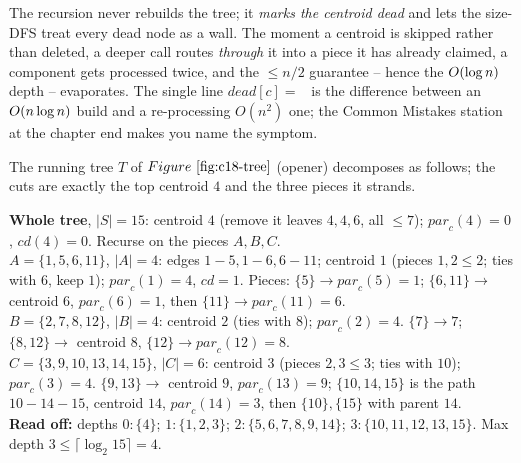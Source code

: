 \begin{insightbox}
The recursion never rebuilds the tree; it \emph{marks the centroid dead} and lets
the size-DFS treat every dead node as a wall. The moment a centroid is skipped
rather than deleted, a deeper call routes \emph{through} it into a piece it has
already claimed, a component gets processed twice, and the \(\le n/2\) guarantee
-- hence the \(O(\log n)\) depth -- evaporates. The single line
\(\mathit{dead}[c]=\)~ is the difference between an
\(O(n\log n)\) build and a re-processing \(O(n^2)\) one; the Common Mistakes
station at the chapter end makes you name the symptom.
\end{insightbox}

The running tree \(T\) of \(\figref{c18-tree}\) (opener) decomposes as follows;
the cuts are exactly the top centroid \(4\) and the three pieces it strands.

\begin{tracebox}
\textbf{Whole tree}, \(|S|=15\): centroid \(4\) (remove it leaves \(4,4,6\), all
\(\le 7\)); \(\mathit{par}_c(4)=0\), \(\mathit{cd}(4)=0\). Recurse on the pieces
\(A,B,C\).\\
\textbf{\(A=\{1,5,6,11\}\)}, \(|A|=4\): edges \(1\!-\!5,1\!-\!6,6\!-\!11\); centroid
\(1\) (pieces \(1,2\le 2\); ties with \(6\), keep \(1\)); \(\mathit{par}_c(1)=4\),
\(\mathit{cd}=1\). Pieces: \(\{5\}\to\mathit{par}_c(5)=1\); \(\{6,11\}\to\) centroid
\(6\), \(\mathit{par}_c(6)=1\), then \(\{11\}\to\mathit{par}_c(11)=6\).\\
\textbf{\(B=\{2,7,8,12\}\)}, \(|B|=4\): centroid \(2\) (ties with \(8\));
\(\mathit{par}_c(2)=4\). \(\{7\}\to7\); \(\{8,12\}\to\) centroid \(8\), \(\{12\}\to
\mathit{par}_c(12)=8\).\\
\textbf{\(C=\{3,9,10,13,14,15\}\)}, \(|C|=6\): centroid \(3\) (pieces \(2,3\le 3\);
ties with \(10\)); \(\mathit{par}_c(3)=4\). \(\{9,13\}\to\) centroid \(9\),
\(\mathit{par}_c(13)=9\); \(\{10,14,15\}\) is the path \(10\!-\!14\!-\!15\), centroid
\(14\), \(\mathit{par}_c(14)=3\), then \(\{10\},\{15\}\) with parent \(14\).\\
\textbf{Read off:} depths \(0\!:\!\{4\}\); \(1\!:\!\{1,2,3\}\);
\(2\!:\!\{5,6,7,8,9,14\}\); \(3\!:\!\{10,11,12,13,15\}\). Max depth \(3\le
\lceil\log_2 15\rceil=4\).
\end{tracebox}

